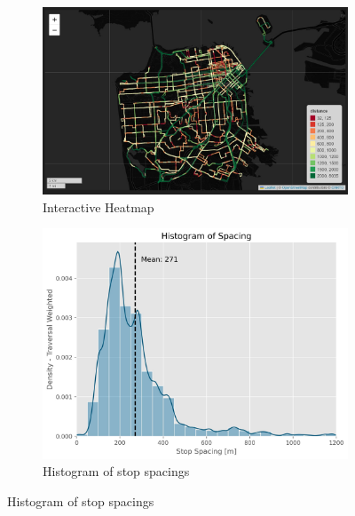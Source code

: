 \documentclass[preview]{standalone}
\begin{document}
\begin{figure}[!h]
    \centering
    \begin{subfigure}[]{0.52\textwidth}
      \centering
      \includegraphics[width=\textwidth]{heatmap_interactive.jpg}
      \caption{Interactive Heatmap}
      \label{fig:div}
      \end{subfigure}
    \begin{subfigure}[]{0.42\textwidth}
      \centering
      \includegraphics[width=\textwidth]{hist.jpg}
      \caption{Histogram of stop spacings}
      \label{fig:hist}
    \end{subfigure}
\end{figure}
\end{document}

